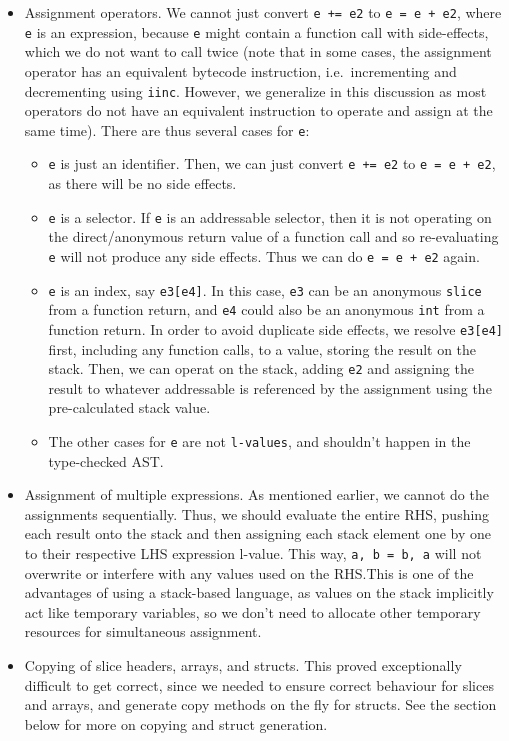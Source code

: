 \documentclass[11pt]{article}
\begin{document}
\begin{itemize}
\item Assignment operators. We cannot just convert \texttt{e += e2} to
  \texttt{e = e + e2}, where \texttt{e} is an expression, because
  \texttt{e} might contain a function call with side-effects, which we
  do not want to call twice (note that in some cases, the assignment
  operator has an equivalent bytecode instruction, i.e.\ incrementing
  and decrementing using \texttt{iinc}. However, we generalize in this
  discussion as most operators do not have an equivalent instruction
  to operate and assign at the same time). There are thus several
  cases for \texttt{e}:
  \begin{itemize}
  \item \texttt{e} is just an identifier. Then, we can just convert
    \texttt{e += e2} to \texttt{e = e + e2}, as there will be no side
    effects.
  \item \texttt{e} is a selector. If \texttt{e} is an addressable
    selector, then it is not operating on the direct/anonymous return
    value of a function call and so re-evaluating \texttt{e} will not
    produce any side effects. Thus we can do \texttt{e = e + e2}
    again.
  \item \texttt{e} is an index, say \texttt{e3[e4]}. In this case,
    \texttt{e3} can be an anonymous \texttt{slice} from a function
    return, and \texttt{e4} could also be an anonymous \texttt{int}
    from a function return. In order to avoid duplicate side effects,
    we resolve \texttt{e3[e4]} first, including any function calls,
    to a value, storing the result on the stack. Then, we can operat
    on the stack, adding \texttt{e2} and assigning the result to whatever
    addressable is referenced by the assignment using the pre-calculated
    stack value.
  \item The other cases for \texttt{e} are not \texttt{l-values}, and
    shouldn't happen in the type-checked AST.\@
  \end{itemize}
  \item Assignment of multiple expressions. As mentioned earlier, we
    cannot do the assignments sequentially. Thus, we should evaluate
    the entire RHS, pushing each result onto the stack and then
    assigning each stack element one by one to their respective LHS
    expression l-value. This way, \texttt{a, b = b, a} will not
    overwrite or interfere with any values used on the RHS.\@ This is
    one of the advantages of using a stack-based language, as values
    on the stack implicitly act like temporary variables, so we don't
    need to allocate other temporary resources for simultaneous
    assignment.
  \item Copying of slice headers, arrays, and structs. This proved
    exceptionally difficult to get correct, since we needed to ensure
    correct behaviour for slices and arrays, and generate copy methods
    on the fly for structs. See the section below for more on copying and
    struct generation.
\end{itemize}
\end{document}
